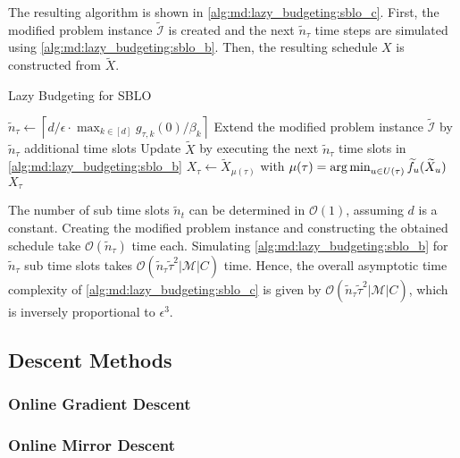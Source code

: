The resulting algorithm is shown in \autoref{alg:md:lazy_budgeting:sblo_c}. First, the modified problem instance $\widetilde{\mathcal{I}}$ is created and the next $\widetilde{n}_{\tau}$ time steps are simulated using \autoref{alg:md:lazy_budgeting:sblo_b}. Then, the resulting schedule $X$ is constructed from $\widetilde{X}$.

\begin{algorithm}
    \caption{Lazy Budgeting for SBLO \cite{Albers2021_2}}\label{alg:md:lazy_budgeting:sblo_c}
    $\widetilde{n}_{\tau} \gets \left\lceil d / \epsilon \cdot \max_{k \in [d]} g_{\tau,k}(0) / \beta_k\right\rceil$\;
    Extend the modified problem instance $\widetilde{\mathcal{I}}$ by $\widetilde{n}_{\tau}$ additional time slots\;
    Update $\widetilde{X}$ by executing the next $\widetilde{n}_{\tau}$ time slots in \autoref{alg:md:lazy_budgeting:sblo_b}\;
    $X_{\tau} \gets \widetilde{X}_{\mu(\tau)}$ with $\mu(\tau) = \operatorname*{arg\,min}_{u \in U(\tau)} \widetilde{f}_u(\widetilde{X}_u)$\;
    \Return $X_{\tau}$\;
\end{algorithm}

The number of sub time slots $\widetilde{n}_t$ can be determined in $\mathcal{O}(1)$, assuming $d$ is a constant. Creating the modified problem instance and constructing the obtained schedule take $\mathcal{O}(\widetilde{n}_{\tau})$ time each. Simulating \autoref{alg:md:lazy_budgeting:sblo_b} for $\widetilde{n}_{\tau}$ sub time slots takes $\mathcal{O}(\widetilde{n}_{\tau} \widetilde{\tau}^2 |\mathcal{M}| C)$ time. Hence, the overall asymptotic time complexity of \autoref{alg:md:lazy_budgeting:sblo_c} is given by $\mathcal{O}(\widetilde{n}_{\tau} \widetilde{\tau}^2 |\mathcal{M}| C)$, which is inversely proportional to $\epsilon^3$.

\subsection{Descent Methods}\label{section:online_algorithms:md:descent_methods}

\subsubsection{Online Gradient Descent}

\subsubsection{Online Mirror Descent}

